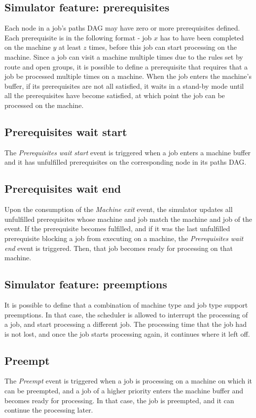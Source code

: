 \subsection{Simulator feature: prerequisites}
Each node in a job's paths DAG may have zero or more prerequisites defined. Each prerequisite is in the following format - job $x$ has to have been completed on the machine $y$ at least $z$ times, before this job can start processing on the machine. Since a job can visit a machine multiple times due to the rules set by route and open groups, it is possible to define a prerequisite that requires that a job be processed multiple times on a machine. When the job enters the machine's buffer, if its prerequisites are not all satisfied, it waits in a stand-by mode until all the prerequisites have become satisfied, at which point the job can be processed on the machine.

\subsection{Prerequisites wait start}
The \textit{Prerequisites wait start} event is triggered when a job enters a machine buffer and it has unfulfilled prerequisites on the corresponding node in its paths DAG.

\subsection{Prerequisites wait end}
Upon the consumption of the \textit{Machine exit} event, the simulator updates all unfulfilled prerequisites whose machine and job match the machine and job of the event. If the prerequisite becomes fulfilled, and if it was the last unfulfilled prerequisite blocking a job from executing on a machine, the \textit{Prerequisites wait end} event is triggered. Then, that job becomes ready for processing on that machine.

\subsection{Simulator feature: preemptions}
It is possible to define that a combination of machine type and job type support preemptions. In that case, the scheduler is allowed to interrupt the processing of a job, and start processing a different job. The processing time that the job had is not lost, and once the job starts processing again, it continues where it left off.

\subsection{Preempt}
The \textit{Preempt} event is triggered when a job is processing on a machine on which it can be preempted, and a job of a higher priority enters the machine buffer and becomes ready for processing. In that case, the job is preempted, and it can continue the processing later.

